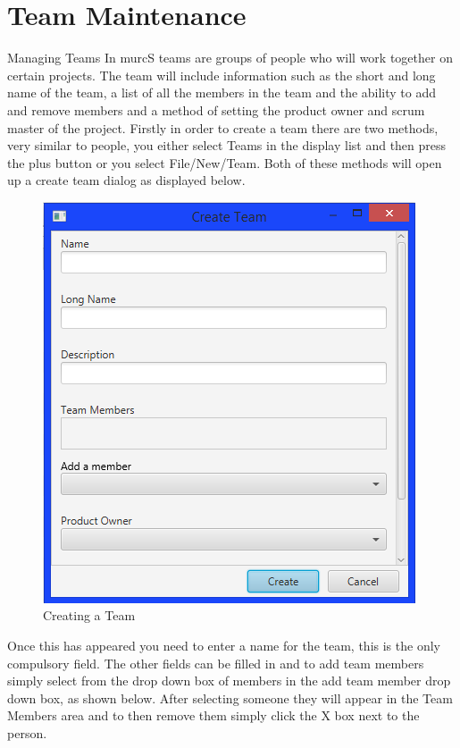 \section{Team Maintenance}

Managing Teams
\newline\newline
In murcS teams are groups of people who will work together on certain projects. The team will include information such as the short and long name of the team, a list of all the members in the team and the ability to add and remove members and a method of setting the product owner and scrum master of the project.
\newline
Firstly in order to create a team there are two methods, very similar to people, you either select Teams in the display list and then press the plus button or you select File/New/Team. Both of these methods will open up a create team dialog as displayed below.

\begin{figure}[H]
\centering
\includegraphics[width=\textwidth]{images/screenshots/teams1.PNG}
\caption{Creating a Team}
\label{fig:new_project}
\end{figure}

Once this has appeared you need to enter a name for the team, this is the only compulsory field. The other fields can be filled in and to add team members simply select from the drop down box of members in the add team member drop down box, as shown below. After selecting someone they will appear in the Team Members area and to then remove them simply click the X box next to the person.

